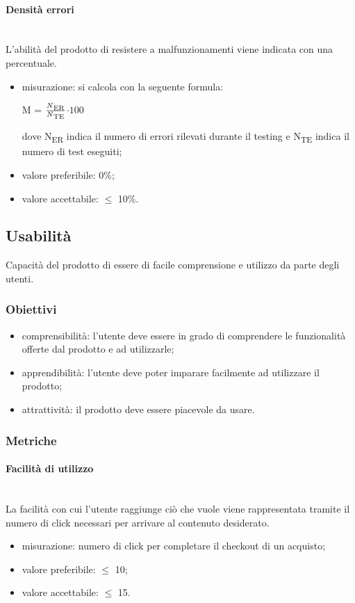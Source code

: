 			\paragraph{Densità errori}\mbox{}\\
			L'abilità del prodotto di resistere a malfunzionamenti viene indicata con una percentuale.
			\begin{itemize}
			\item misurazione: si calcola con la seguente formula: \\
			\centerline{ M =  \(\frac{N\textsubscript{ER}}{N\textsubscript{TE}} \)$ \cdot 100$ }
			dove N\textsubscript{ER} indica il numero di errori rilevati durante il testing e N\textsubscript{TE} indica il numero di test eseguiti;
			\item valore preferibile: 0\%;
			\item valore accettabile: $\leq$ 10\%.
			\end{itemize}
	\subsection{Usabilità}
	Capacità del prodotto di essere di facile comprensione e utilizzo da parte degli utenti.
		\subsubsection{Obiettivi}
		\begin{itemize}
			\item comprensibilità: l'utente deve essere in grado di comprendere le funzionalità offerte dal prodotto e ad utilizzarle;
			\item apprendibilità: l'utente deve poter imparare facilmente ad utilizzare il prodotto;
			\item attrattività: il prodotto deve essere piacevole da usare.
		\end{itemize}
		\subsubsection{Metriche}
			\paragraph{Facilità di utilizzo}\mbox{}\\
			La facilità con cui l'utente raggiunge ciò che vuole viene rappresentata tramite il numero di click necessari per arrivare al contenuto desiderato.
			\begin{itemize}
			\item misurazione: numero di click per completare il checkout di un acquisto;
			\item valore preferibile: $\leq$ 10;
			\item valore accettabile: $\leq$ 15.
			\end{itemize}
